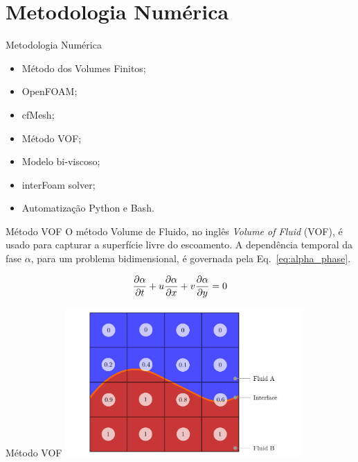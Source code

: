 \section{Metodologia Numérica}

\begin{frame}
    \begin{exampleblock}{Metodologia Numérica}
        \begin{itemize}
            \item Método dos Volumes Finitos; \pause
            \item OpenFOAM; \pause
            \item cfMesh; \pause
            \item Método VOF; \pause
            \item Modelo bi-viscoso; \pause
            \item interFoam solver; \pause
            \item Automatização Python e Bash.
        \end{itemize}
    \end{exampleblock}
\end{frame}

\begin{frame}{Método VOF}
    O método Volume de Fluido, no inglês \textit{Volume of Fluid} (VOF), é usado para capturar a superfície livre do escoamento. A dependência temporal da fase $\alpha$, para um problema bidimensional, é governada pela Eq.~\ref{eq:alpha_phase}.

    \begin{equation} \label{eq:alpha_phase}
        \frac{\partial \alpha}{\partial t} + u \frac{\partial \alpha}{\partial x} + v \frac{\partial \alpha}{\partial y} = 0
    \end{equation}

\end{frame}

\begin{frame}{Método VOF} 
    \centering
    \includegraphics[width=0.68\textwidth]{images/vof.pdf}
\end{frame}

